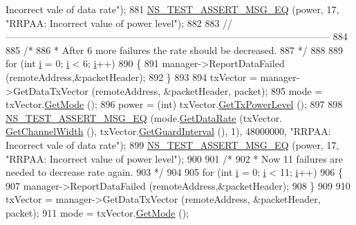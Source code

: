 \begin{DoxyCode}
{       Incorrect vale of data rate"});
881   \hyperlink{group__testing_ga2a9d78cffb3db8e867c35fff0b698cf5}{NS\_TEST\_ASSERT\_MSG\_EQ} (power, 17, \textcolor{stringliteral}{"RRPAA: Incorrect value of power level"});
882 
883   \textcolor{comment}{//-----------------------------------------------------------------------------------------------------}
884 
885   \textcolor{comment}{/*}
886 \textcolor{comment}{   * After 6 more failures the rate should be decreased.}
887 \textcolor{comment}{   */}
888 
889   \textcolor{keywordflow}{for} (\textcolor{keywordtype}{int} \hyperlink{bernuolliDistribution_8m_a6f6ccfcf58b31cb6412107d9d5281426}{i} = 0; \hyperlink{bernuolliDistribution_8m_a6f6ccfcf58b31cb6412107d9d5281426}{i} < 6; \hyperlink{bernuolliDistribution_8m_a6f6ccfcf58b31cb6412107d9d5281426}{i}++)
890     \{
891       manager->ReportDataFailed (remoteAddress,&packetHeader);
892     \}
893 
894   txVector = manager->GetDataTxVector (remoteAddress, &packetHeader, packet);
895   mode = txVector.\hyperlink{classns3_1_1WifiTxVector_a497b1f11cad4b8b26251dfa07c9ad1d6}{GetMode} ();
896   power = (int) txVector.\hyperlink{classns3_1_1WifiTxVector_a7c98bd9609ff1c5cefa6e22d6908a2fe}{GetTxPowerLevel} ();
897 
898   \hyperlink{group__testing_ga2a9d78cffb3db8e867c35fff0b698cf5}{NS\_TEST\_ASSERT\_MSG\_EQ} (mode.\hyperlink{classns3_1_1WifiMode_adcfbe150f69da720db23387f733b8a52}{GetDataRate} (txVector.
      \hyperlink{classns3_1_1WifiTxVector_a1f8bfa51778a3e217581eb665f059564}{GetChannelWidth} (), txVector.\hyperlink{classns3_1_1WifiTxVector_ab80c0fd812542ef337a6cace4f64db63}{GetGuardInterval} (), 1), 48000000, \textcolor{stringliteral}{"RRPAA:
       Incorrect vale of data rate"});
899   \hyperlink{group__testing_ga2a9d78cffb3db8e867c35fff0b698cf5}{NS\_TEST\_ASSERT\_MSG\_EQ} (power, 17, \textcolor{stringliteral}{"RRPAA: Incorrect value of power level"});
900 
901   \textcolor{comment}{/*}
902 \textcolor{comment}{   * Now 11 failures are needed to decrease rate again.}
903 \textcolor{comment}{   */}
904 
905   \textcolor{keywordflow}{for} (\textcolor{keywordtype}{int} \hyperlink{bernuolliDistribution_8m_a6f6ccfcf58b31cb6412107d9d5281426}{i} = 0; \hyperlink{bernuolliDistribution_8m_a6f6ccfcf58b31cb6412107d9d5281426}{i} < 11; \hyperlink{bernuolliDistribution_8m_a6f6ccfcf58b31cb6412107d9d5281426}{i}++)
906     \{
907       manager->ReportDataFailed (remoteAddress,&packetHeader);
908     \}
909 
910   txVector = manager->GetDataTxVector (remoteAddress, &packetHeader, packet);
911   mode = txVector.\hyperlink{classns3_1_1WifiTxVector_a497b1f11cad4b8b26251dfa07c9ad1d6}{GetMode} ();

\end{DoxyCode}
